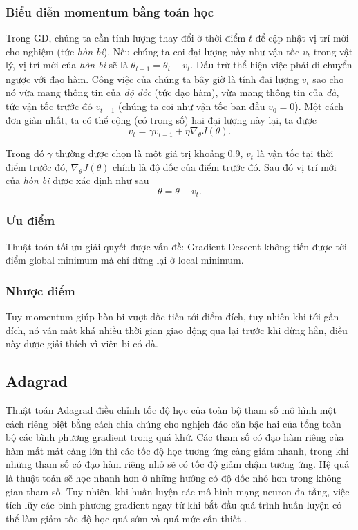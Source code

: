 \documentclass[11pt,oneside,a4paper]{report}
\theoremstyle{definition}
\begin{document}
\subsubsection{Biểu diễn momentum bằng toán học}
Trong GD, chúng ta cần tính lượng thay đổi ở thời điểm $t$ để cập nhật vị trí mới cho nghiệm (tức \textit{hòn bi}). Nếu chúng ta coi đại lượng này như vận tốc $v_t$ trong vật lý, vị trí mới của \textit{hòn bi} sẽ là $\theta_{t+1} = \theta_{t} - v_t$. Dấu trừ thể hiện việc phải di chuyển ngược với đạo hàm. Công việc của chúng ta bây giờ là tính đại lượng $v_t$ sao cho nó vừa mang thông tin của \textit{độ dốc} (tức đạo hàm), vừa mang thông tin của \textit{đà}, tức vận tốc trước đó $v_{t-1}$ (chúng ta coi như vận tốc ban đầu $v_0=0$). Một cách đơn giản nhất, ta có thể cộng (có trọng số) hai đại lượng này lại, ta được 
\begin{equation} 
v_{t}= \gamma v_{t-1} + \eta \nabla_{\theta}J(\theta) .
\end{equation} 

Trong đó $\gamma$ thường được chọn là một giá trị khoảng 0.9, $v_t$ là vận tốc tại thời điểm trước đó, $ \nabla_{\theta}J(\theta)$ chính là độ dốc của điểm trước đó.  
Sau đó vị trí mới của \textit{hòn bi} được xác định như sau
\begin{equation} 
\theta = \theta - v_t .
\end{equation} 
\subsubsection{Ưu điểm}
Thuật toán tối ưu giải quyết được vấn đề: Gradient Descent không tiến được tới điểm global minimum mà chỉ dừng lại ở local minimum.
\subsubsection{Nhược điểm}
Tuy momentum giúp hòn bi vượt dốc tiến tới điểm đích, tuy nhiên khi tới gần đích, nó vẫn mất khá nhiều thời gian giao động qua lại trước khi dừng hẳn, điều này được giải thích vì viên bi có đà.

\subsection{Adagrad}
Thuật toán Adagrad điều chỉnh tốc độ học của toàn bộ tham số mô hình một cách riêng biệt bằng cách chia chúng cho nghịch đảo căn bậc hai của tổng toàn bộ các bình phương gradient trong quá khứ. Các tham số có đạo hàm riêng của hàm mất mát càng lớn thì các tốc độ học tương ứng càng giảm nhanh, trong khi những tham số có đạo hàm riêng nhỏ sẽ có tốc độ giảm chậm tương ứng. Hệ quả là thuật toán sẽ học nhanh hơn ở những hướng có độ dốc nhỏ hơn trong không gian tham số. Tuy nhiên, khi huấn luyện các mô hình mạng neuron đa tầng, việc tích lũy các bình phương gradient ngay từ khi bắt đầu quá trình huấn luyện có thể làm giảm tốc độ học quá sớm và quá mức cần thiết \cite{1,6}.
\end{document}
